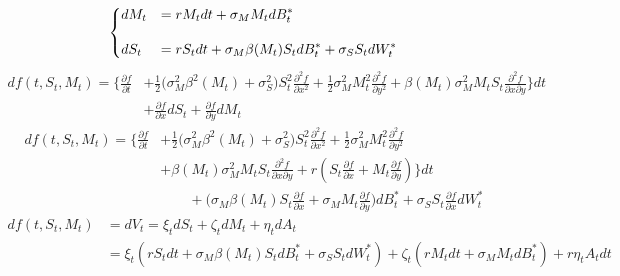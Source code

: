 \documentclass[12pt]{article}
\newenvironment{solution}[2][Solution]{\begin{trivlist}
\item[\hskip \labelsep {\bfseries #1}\hskip \labelsep {\bfseries #2.}]}{\end{trivlist}}
\newenvironment{question}[2][Question]{\begin{trivlist}
\item[\hskip \labelsep {\bfseries #1}\hskip \labelsep {\bfseries #2.}]}{\end{trivlist}}
\begin{document}
\newpage
\begin{question}{7}
\end{question}
\begin{solution}[Solution] \\ 
\begin{align*}
    \begin{dcases}
    dM_t &= rM_t dt +\sigma_M M_t dB_t^*\\[10pt]
    dS_t &= rS_t dt+ \sigma_M \beta(M_t)S_t dB_t^*+\sigma_S S_t dW_t^*
    \end{dcases}
\end{align*}
\begin{align*}
    df(t,S_t, M_t) = \bigg\{\frac{\partial f}{\partial t}& + \frac{1}{2}\bigg(\sigma_M^2 \beta^2(M_t) +\sigma_S^2\bigg)S_t^2 \frac{\partial^2 f}{\partial x^2} +\frac{1}{2}\sigma_M^2 M_t^2 \frac{\partial^2 f}{\partial y^2} + \beta(M_t)\sigma_M^2 M_t S_t\frac{\partial^2 f}{\partial x \partial y}\bigg\}dt \\
    &+ \frac{\partial f}{\partial x}dS_t +\frac{\partial f}{\partial y}dM_t
\end{align*}
\begin{align*}
    df(t,S_t, M_t) = \bigg\{\frac{\partial f}{\partial t} &+ \frac{1}{2}\bigg(\sigma_M^2 \beta^2(M_t) +\sigma_S^2\bigg)S_t^2 \frac{\partial^2 f}{\partial x^2} + \frac{1}{2}\sigma_M^2 M_t^2 \frac{\partial^2 f}{\partial y^2} \\
    &+ \beta(M_t)\sigma_M^2 M_t S_t\frac{\partial^2 f}{\partial x \partial y} + r\left(S_t\frac{\partial f}{\partial x} +M_t\frac{\partial f}{\partial y} \right)\bigg\}dt \\
    &\qquad +\bigg(\sigma_M \beta(M_t)S_t \frac{\partial f}{\partial x} + \sigma_M M_t\frac{\partial f}{\partial y} \bigg)dB_t^* +\sigma_S S_t \frac{\partial f}{\partial x}dW_t^*
    \tag{7.1}
\end{align*}
\begin{align*}
    df(t,S_t, M_t) &= dV_t = \xi_t dS_t + \zeta_t dM_t + \eta_t dA_t \\
    &= \xi_t (rS_t dt+ \sigma_M \beta(M_t)S_t dB_t^*+\sigma_S S_t dW_t^*) + \zeta_t (rM_t dt +\sigma_M M_t dB_t^*) + r\eta_t A_t dt\\

\end{align*}
\end{solution}
\end{document}
